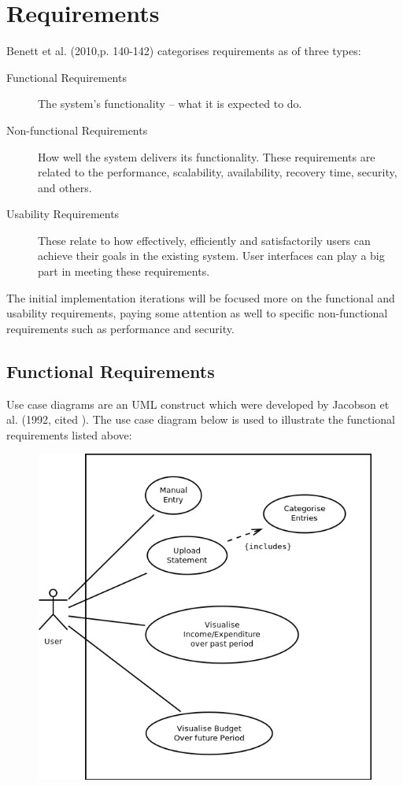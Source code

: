 \section{Requirements} \label{sec:Requirements}

Benett et al. (2010,p. 140-142) \nocite{bennett2010object} categorises
requirements as of three types:

\begin{description} \item[Functional Requirements]
    The system's functionality -- what it is expected to do.
    
  \item[Non-functional Requirements]
    How well the system delivers its functionality. These requirements are
    related to the performance, scalability, availability, recovery time,
    security, and others.

  \item[Usability Requirements]
    These relate to how effectively, efficiently and satisfactorily users can
    achieve their goals in the existing system. User interfaces can play a big
    part in meeting these requirements.
\end{description}

The initial implementation iterations will be focused more on the functional
and usability requirements, paying some attention as well to specific
non-functional requirements such as performance and security.


\subsection{Functional Requirements} \label{sec:Requirements.FunctionalRequirements}


Use case diagrams are an UML construct which were developed by Jacobson et al.
(1992, cited \cite[][p.~154]{bennett2010object}). The use case diagram below is
used to illustrate the functional requirements listed above:

\begin{figure}[ht!]
  \begin{center}
    \includegraphics[width=14cm]{./contents/img/Use_Case_Diagram.png}
  \end{center}
\end{figure}
\FloatBarrier
